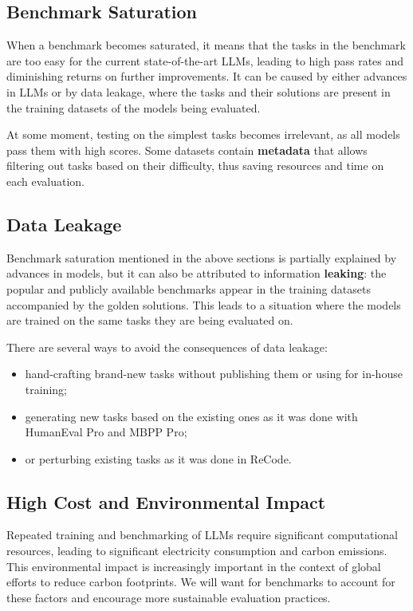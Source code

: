 \subsection{Benchmark Saturation}

When a benchmark becomes saturated, it means that the tasks in the benchmark are too easy for the current state-of-the-art LLMs, leading to high pass rates and diminishing returns on further improvements.
It can be caused by either advances in LLMs or by data leakage, where the tasks and their solutions are present in the training datasets of the models being evaluated.

At some moment, testing on the simplest tasks becomes irrelevant, as all models pass them with high scores.
Some datasets contain \textbf{metadata} that allows filtering out tasks based on their difficulty, thus saving resources and time on each evaluation.

\subsection{Data Leakage}

Benchmark saturation mentioned in the above sections is partially explained by advances in models, but it can also be attributed to information \textbf{leaking}: the popular and publicly available benchmarks appear in the training datasets accompanied by the golden solutions.
This leads to a situation where the models are trained on the same tasks they are being evaluated on.

There are several ways to avoid the consequences of data leakage:
\begin{itemize}
    \item hand-crafting brand-new tasks without publishing them or using for in-house training;
    \item generating new tasks based on the existing ones as it was done with HumanEval Pro and MBPP Pro;
    \item or perturbing existing tasks as it was done in ReCode.
\end{itemize}

\subsection{High Cost and Environmental Impact}

Repeated training and benchmarking of LLMs require significant computational resources, leading to significant electricity consumption and carbon emissions.
This environmental impact is increasingly important in the context of global efforts to reduce carbon footprints.
We will want for benchmarks to account for these factors and encourage more sustainable evaluation practices.

